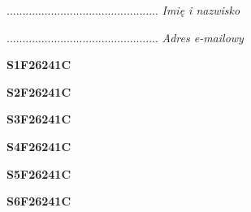 \begin{turn}{90}\begin{minipage}{\linewidth} \vspace{20mm} ................................................  \textit{Imię i nazwisko}\end{minipage}\end{turn}

\begin{turn}{90}\begin{minipage}{\linewidth} \vspace{20mm} ................................................  \textit{Adres e-mailowy}\end{minipage}\end{turn}

\begin{turn}{90}\huge \begin{minipage}{\linewidth} \vspace{10mm}\textbf{S1F26241C}\end{minipage}\end{turn}

\begin{turn}{90}\huge \begin{minipage}{\linewidth} \vspace{10mm}\textbf{S2F26241C}\end{minipage}\end{turn}

\begin{turn}{90}\huge \begin{minipage}{\linewidth} \vspace{10mm}\textbf{S3F26241C}\end{minipage}\end{turn}

\begin{turn}{90}\huge \begin{minipage}{\linewidth} \vspace{10mm}\textbf{S4F26241C}\end{minipage}\end{turn}

\begin{turn}{90}\huge \begin{minipage}{\linewidth} \vspace{10mm}\textbf{S5F26241C}\end{minipage}\end{turn}

\begin{turn}{90}\huge \begin{minipage}{\linewidth} \vspace{10mm}\textbf{S6F26241C}\end{minipage}\end{turn}

